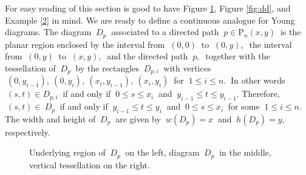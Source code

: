 \documentclass[10pt,leqeq]{article}
\begin{document}
For easy reading of this section is good to have  Figure \ref{fig:cyd}, Figure \ref{fig:dd}, and  Example \ref{2} in mind.
We are ready to define a continuous analogue for Young diagrams.
The diagram $\ D_p \ $ associated to a directed path $\ p \in \mathrm{P}_n(x,y)\ $ is  the planar region  enclosed by the interval from $\ (0,0)\ $ to $\ (0,y),\ $ the interval from $\ (0,y)\ $ to  $\ (x,y),\ $ and the directed path $ \ p, \ $ together with the tessellation of  $\ D_p \ $ by the rectangles $\ D_{p,i} \ $  with vertices $\ (0,y_{i-1}), \ (0,y_{i}), \ (x_i,y_{i-1}), \ (x_i,y_{i}) \ $ for
$\ 1 \leq i \leq n. \ $  In other words $\ (s,t) \in  D_{p,i} \ $ if and only if
$\ 0 \leq s \leq x_i \ $ and $\  y_{i-1} \leq t \leq y_{i-1}. $  
Therefore, $\ (s,t) \in \ D_{p} \ $ if and only if
$\  y_{i-1} \leq t \leq y_{i}\ $ and $\ 0 \leq s \leq x_i \ $ for some $\ 1 \leq i \leq n. \ $
The width and height of $\ D_p \ $ are given by 
 $\ w(D_p)=x \ $ and   $ \ h(D_p)=y,\ $ respectively.\\


\begin{figure}

  \caption{  Underlying region of $\ D_p \ $ on the left,  diagram  $\ D_p \ $ in the middle,  vertical tessellation on the right. }
  \label{fig:cyd}
\end{figure}
\end{document}

